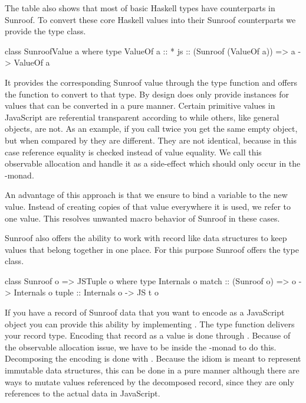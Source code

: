 The table also shows that most of basic Haskell types have counterparts in
Sunroof. To convert these core Haskell values into their Sunroof 
counterparts we provide the  type class.
\begin{Code}
class SunroofValue a where
  type ValueOf a :: *
  js :: (Sunroof (ValueOf a)) => a -> ValueOf a
\end{Code}
It provides the corresponding Sunroof value through the type function
 \cite{Chakravarty:05:AssociatedTypeSynonyms} and offers the function 
 to convert to that type. By design  does
only provide instances for values that can be converted in a pure
manner. Certain primitive values in JavaScript are referential 
transparent according to \Src{==} while others, like general objects,
are not. As an example, if you call  twice you get the 
same empty object, but when compared by \Src{==} they are different. They
are not identical, because in this case reference equality is checked
instead of value equality. We call this observable allocation and handle 
it as a side-effect which should only occur in the \JS-monad. 

An advantage of this approach is that we ensure to bind a variable to the 
new value. Instead of creating copies of that value everywhere
it is used, we refer to one value. This resolves 
unwanted macro behavior of Sunroof in these cases.

Sunroof also offers the ability to work with record like data structures to 
keep values that belong together in one place.
For this purpose Sunroof offers the  type class.
\begin{Code}
class Sunroof o => JSTuple o where
  type Internals o
  match :: (Sunroof o) => o -> Internals o
  tuple :: Internals o -> JS t o
\end{Code}
If you have a record of Sunroof data that you want to
encode as a JavaScript object you can provide this ability 
by implementing . The  type function
delivers your record type. Encoding that record as a 
value is done through . 
Because of the observable allocation issue, we have to be 
inside the \JS-monad to do this.
Decomposing the encoding is done with . Because the
 idiom is meant to represent immutable data structures, this 
can be done in a pure manner although there are ways to mutate 
values referenced by the decomposed record, since they are only 
references to the actual data in JavaScript.

